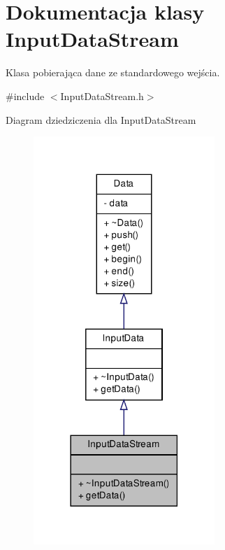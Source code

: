 \hypertarget{class_input_data_stream}{\section{\-Dokumentacja klasy \-Input\-Data\-Stream}
\label{class_input_data_stream}
}


\-Klasa pobierająca dane ze standardowego wejścia.  




{\ttfamily \#include $<$\-Input\-Data\-Stream.\-h$>$}



\-Diagram dziedziczenia dla \-Input\-Data\-Stream\nopagebreak
\begin{figure}[H]
\begin{center}
\leavevmode
\includegraphics[width=194pt]{class_input_data_stream__inherit__graph}
\end{center}
\end{figure}


